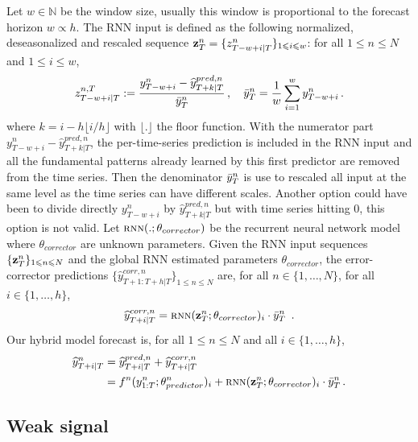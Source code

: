 \documentclass[review]{elsarticle}
\newcommand{\ts}{y}
\newcommand{\tspred}{\widehat{\ts}}
\newcommand{\stat}{f}
\newcommand{\statparam}{\theta_{predictor}}
\newcommand{\lag}{h}
\newcommand{\window}{w}
\newcommand{\meants}{\Bar{\ts}}
\newcommand{\rnnwindow}{{\bf \rnninput}}
\newcommand{\rnninput}{z}
\newcommand{\rnn}{\textsc{rnn}}
\newcommand{\rnnparam}{\theta_{corrector}}
\begin{document}
Let $\window \in \mathbb{N}$ be the window size, usually this window is proportional to the forecast horizon $\window \propto \lag$. The RNN input is defined as the following  normalized, deseasonalized and rescaled sequence $\rnnwindow^n_T = \{\rnninput^{n}_{T-\window+i|T}\}_{1\leqslant i \leqslant w}$: for all $1\leqslant n \leqslant N$ and $1\leqslant i \leqslant w$,
$$
\rnninput^{n,T}_{T-w+i|T} := \frac{\ts^n_{T-w+i} -\tspred^{pred,n}_{T+k|T}}{\meants^n_T}\,,\quad \meants^n_T = \frac{1}{w}\sum_{i = 1}^{w}\ts^n_{T-w+i}\,.
$$
where $k = i - h\lfloor i/h \rfloor$ with $\lfloor. \rfloor$ the floor function. With the numerator part $\ts^n_{T-w+i} -\tspred^{pred,n}_{T+k|T}$, the per-time-series prediction is included in the RNN input and all the fundamental patterns already learned by this first predictor are removed from the time series. Then the denominator $\meants^n_T$ is use to rescaled all input at the same level as the time series can have different scales. Another option could have been to divide directly  $\ts^n_{T-w+i}$ by $\tspred^{pred,n}_{T+k|T}$ but with time series hitting 0, this option is not valid. Let $\rnn(.;\rnnparam)$ be the recurrent neural network model where $\rnnparam$ are  unknown parameters. Given the RNN input sequences $\{\rnnwindow^n_T\}_{1\leqslant n \leqslant N}$ and the global RNN estimated parameters $\rnnparam$, the error-corrector predictions $\{\tspred^{corr,n}_{T+1:T+\lag|T}\}_{1\leqslant n \leqslant N}$ are, for all $n \in \{1,\ldots,N\}$, for all $i \in \{1,\ldots,\lag\}$,
$$
\tspred^{corr,n}_{T+i|T} = \rnn(\rnnwindow^n_T;\rnnparam)_i \cdot \meants^n_T\ \,.
$$
Our hybrid model forecast is, for all $1\leqslant n \leqslant N$ and all $i \in \{1,\ldots,\lag\}$,
\begin{align}
\label{eq:nows:full:model}
\tspred^n_{T+i|T}  &= \tspred^{pred,n}_{T+i|T} +  \tspred^{corr,n}_{T+i|T} \\
&= \stat^n(\ts^n_{1:T};\statparam^n)_i +  \rnn(\rnnwindow^n_T;\rnnparam)_i \cdot \meants^n_T\,.\nonumber
\end{align}


\subsection{Weak signal}
\end{document}
